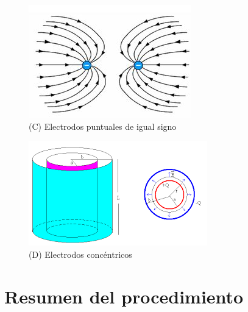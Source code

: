 \documentclass[letterpaper, 12pt]{report}
\begin{document}
\begin{figure}[H]
	\begin{center}
		\includegraphics[scale = 1]{./Images/C.png}
		\caption{(C) Electrodos puntuales de igual signo}
	\end{center}
\end{figure}

\begin{figure}[H]
	\begin{center}
		\includegraphics[scale = 1.5]{./Images/D.png}
		\caption{(D) Electrodos concéntricos}
	\end{center}
\end{figure}

\section{Resumen del procedimiento}

\newpage

\end{document}
